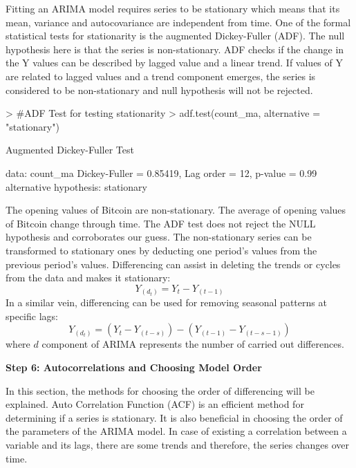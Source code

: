 \documentclass{article}
\begin{document}
Fitting an ARIMA model requires series to be stationary which means that its mean, variance and autocovariance are independent from time. One of the formal statistical tests for stationarity is the augmented Dickey-Fuller (ADF). The null hypothesis here is that the series is non-stationary. ADF checks if the change in the Y values can be described by lagged value and a linear trend. If values of Y are related to lagged values and a trend component emerges, the series is considered to be non-stationary and null hypothesis will not be rejected.
\begin{Schunk}
\begin{Sinput}
> #ADF Test for testing stationarity
> adf.test(count_ma, alternative = "stationary")
\end{Sinput}
\begin{Soutput}
	Augmented Dickey-Fuller Test

data:  count_ma
Dickey-Fuller = 0.85419, Lag order = 12, p-value = 0.99
alternative hypothesis: stationary
\end{Soutput}
\end{Schunk}
The opening values of Bitcoin are non-stationary. The average of opening values of Bitcoin change through time. The ADF test does not reject the NULL hypothesis and corroborates our guess.
The non-stationary series can be transformed to stationary ones by deducting one period's values from the previous period's values. Differencing can assist in deleting the trends or cycles from the data and makes it stationary:
\begin{equation}
Y_(d_t )=Y_t-Y_(t-1)
\end{equation}
In a similar vein, differencing can be used for removing seasonal patterns at specific lags:
\begin{equation}
Y_(d_t )=(Y_t-Y_(t-s) )-(Y_(t-1)-Y_(t-s-1))
\end{equation}
where $d$ component of ARIMA represents the number of carried out differences.

\textbf{Step 6: Autocorrelations and Choosing Model Order}

In this section, the methods for choosing the order of differencing will be explained. Auto Correlation Function (ACF) is an efficient method for determining if a series is stationary. It is also beneficial in choosing the order of the parameters of the ARIMA model.  In case of existing a correlation between a variable and its lags, there are some trends and therefore, the series changes over time. 
\end{document}
